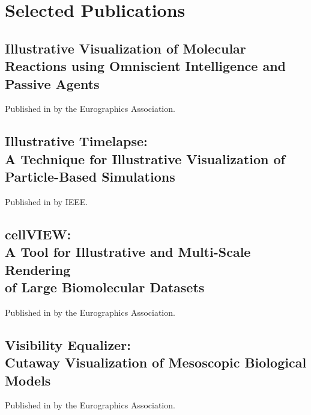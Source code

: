 \part{Selected Publications}

\renewcommand\appendixname{Paper}
\appendix



\chapter{Illustrative Visualization of Molecular Reactions using Omniscient Intelligence and Passive Agents}

\begin{flushright}
	Published in \cite{le2014illustrative} by the Eurographics Association.
\end{flushright}




\chapter{Illustrative Timelapse: \\
	A Technique for Illustrative Visualization 	of Particle-Based Simulations}

\begin{flushright}
	Published in \cite{le2015illustrative} by IEEE.
\end{flushright}




\chapter{cellVIEW: \\
	A Tool for Illustrative and Multi-Scale Rendering \\
	of Large Biomolecular Datasets}

\begin{flushright}
	Published in \cite{le2015cellview} by the Eurographics Association.
\end{flushright}




\chapter{Visibility Equalizer: \\
	Cutaway Visualization of Mesoscopic Biological Models}

\begin{flushright}
	Published in \cite{le2016visibility} by the Eurographics Association.
\end{flushright}


